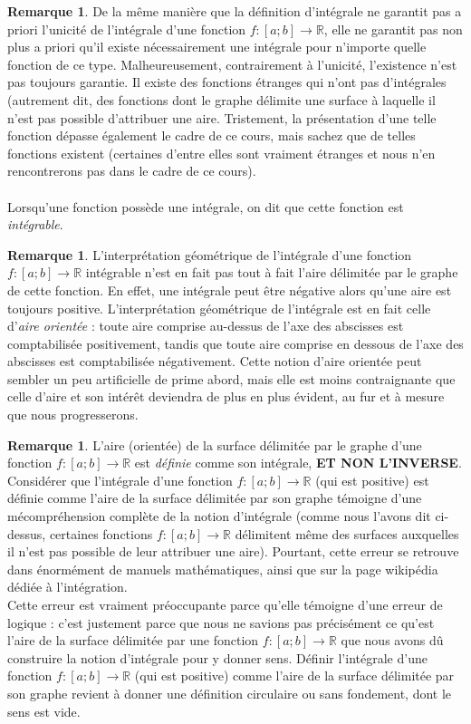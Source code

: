 \documentclass[a4paper,fontsize=13pt]{scrreprt}
\theoremstyle{plain}
\theoremstyle{definition}
\newtheorem{rema}[subsection]{Remarque}
\newcommand{\rr}{\mathbb{R}}
\begin{document}
\newpage
\begin{rema}
De la même manière que la définition d'intégrale ne garantit pas a priori l'unicité de l'intégrale d'une fonction $f : [a;b] \to \rr$, elle ne garantit pas non plus a priori qu'il existe nécessairement une intégrale pour n'importe quelle fonction de ce type. Malheureusement, contrairement à l'unicité, l'existence n'est pas toujours garantie. Il existe des fonctions étranges qui n'ont pas d'intégrales (autrement dit, des fonctions dont le graphe délimite une \og surface \fg{} à laquelle il n'est pas possible d'attribuer une aire. Tristement, la présentation d'une telle fonction dépasse également le cadre de ce cours, mais sachez que de telles fonctions existent (certaines d'entre elles sont vraiment étranges et nous n'en rencontrerons pas dans le cadre de ce cours). \\
~\\
Lorsqu'une fonction possède une intégrale, on dit que cette fonction est \emph{intégrable}.
\end{rema}
\vspace{0.5cm}
\begin{rema}
L'interprétation géométrique de l'intégrale d'une fonction $f : [a;b] \to \rr$ intégrable n'est en fait pas tout à fait l'aire délimitée par le graphe de cette fonction. En effet, une intégrale peut être négative alors qu'une aire est toujours positive. L'interprétation géométrique de l'intégrale est en fait celle d'\emph{aire orientée} : toute aire comprise au-dessus de l'axe des abscisses est comptabilisée positivement, tandis que toute aire comprise en dessous de l'axe des abscisses est comptabilisée négativement. Cette notion d'aire orientée peut sembler un peu artificielle de prime abord, mais elle est moins contraignante que celle d'aire et son intérêt deviendra de plus en plus évident, au fur et à mesure que nous progresserons.
\end{rema}
\begin{rema}
L'aire (orientée) de la surface délimitée par le graphe d'une fonction $f : [a;b] \to \rr$ est \emph{définie} comme son intégrale, \textbf{ET NON L'INVERSE}. Considérer que l'intégrale d'une fonction $f : [a;b] \to \rr$ (qui est positive) est définie comme l'aire de la surface délimitée par son graphe témoigne d'une mécompréhension complète de la notion d'intégrale (comme nous l'avons dit ci-dessus, certaines fonctions $f : [a;b] \to \rr$ délimitent même des \og surfaces \fg{} auxquelles il n'est pas possible de leur attribuer une aire). Pourtant, cette erreur se retrouve dans énormément de manuels mathématiques, ainsi que sur la page wikipédia dédiée à l'intégration. \\
Cette erreur est vraiment préoccupante parce qu'elle témoigne d'une erreur de logique : c'est justement parce que nous ne savions pas précisément ce qu'est l'aire de la surface délimitée par une fonction $f : [a;b] \to \rr$ que nous avons dû construire la notion d'intégrale pour y donner sens. Définir l'intégrale d'une fonction $f : [a;b] \to \rr$ (qui est positive) comme l'aire de la surface délimitée par son graphe revient à donner une définition circulaire ou sans fondement, dont le sens est vide.
\end{rema}
\end{document}

